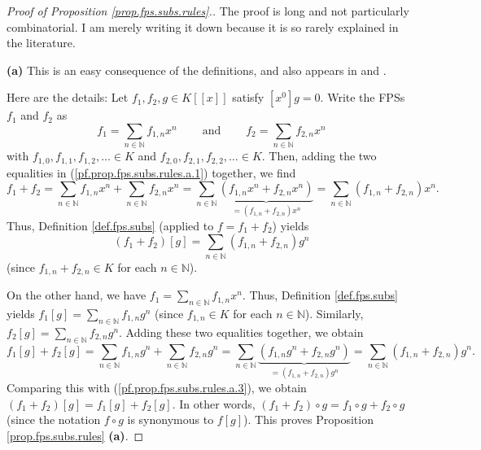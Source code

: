 \begin{proof}
[Proof of Proposition \ref{prop.fps.subs.rules}.]The proof is long and not
particularly combinatorial. I am merely writing it down because it is so
rarely explained in the literature. \medskip

\textbf{(a)} This is an easy consequence of the definitions, and also appears
in \cite[Theorem 7.62]{Loehr-BC} and \cite[Proposition 2.2.2]{Brewer14}.

Here are the details: Let $f_{1},f_{2},g\in K\left[  \left[  x\right]
\right]  $ satisfy $\left[  x^{0}\right]  g=0$. Write the FPSs $f_{1}$ and
$f_{2}$ as
\begin{equation}
f_{1}=\sum_{n\in\mathbb{N}}f_{1,n}x^{n}\ \ \ \ \ \ \ \ \ \ \text{and}%
\ \ \ \ \ \ \ \ \ \ f_{2}=\sum_{n\in\mathbb{N}}f_{2,n}x^{n}
\label{pf.prop.fps.subs.rules.a.1}%
\end{equation}
with $f_{1,0},f_{1,1},f_{1,2},\ldots\in K$ and $f_{2,0},f_{2,1},f_{2,2}%
,\ldots\in K$. Then, adding the two equalities in
(\ref{pf.prop.fps.subs.rules.a.1}) together, we find%
\[
f_{1}+f_{2}=\sum_{n\in\mathbb{N}}f_{1,n}x^{n}+\sum_{n\in\mathbb{N}}%
f_{2,n}x^{n}=\sum_{n\in\mathbb{N}}\underbrace{\left(  f_{1,n}x^{n}%
+f_{2,n}x^{n}\right)  }_{=\left(  f_{1,n}+f_{2,n}\right)  x^{n}}=\sum
_{n\in\mathbb{N}}\left(  f_{1,n}+f_{2,n}\right)  x^{n}.
\]
Thus, Definition \ref{def.fps.subs} (applied to $f=f_{1}+f_{2}$) yields%
\begin{equation}
\left(  f_{1}+f_{2}\right)  \left[  g\right]  =\sum_{n\in\mathbb{N}}\left(
f_{1,n}+f_{2,n}\right)  g^{n} \label{pf.prop.fps.subs.rules.a.3}%
\end{equation}
(since $f_{1,n}+f_{2,n}\in K$ for each $n\in\mathbb{N}$).

On the other hand, we have $f_{1}=\sum_{n\in\mathbb{N}}f_{1,n}x^{n}$. Thus,
Definition \ref{def.fps.subs} yields $f_{1}\left[  g\right]  =\sum
_{n\in\mathbb{N}}f_{1,n}g^{n}$ (since $f_{1,n}\in K$ for each $n\in\mathbb{N}%
$). Similarly, $f_{2}\left[  g\right]  =\sum_{n\in\mathbb{N}}f_{2,n}g^{n}$.
Adding these two equalities together, we obtain%
\[
f_{1}\left[  g\right]  +f_{2}\left[  g\right]  =\sum_{n\in\mathbb{N}}%
f_{1,n}g^{n}+\sum_{n\in\mathbb{N}}f_{2,n}g^{n}=\sum_{n\in\mathbb{N}%
}\underbrace{\left(  f_{1,n}g^{n}+f_{2,n}g^{n}\right)  }_{=\left(
f_{1,n}+f_{2,n}\right)  g^{n}}=\sum_{n\in\mathbb{N}}\left(  f_{1,n}%
+f_{2,n}\right)  g^{n}.
\]
Comparing this with (\ref{pf.prop.fps.subs.rules.a.3}), we obtain $\left(
f_{1}+f_{2}\right)  \left[  g\right]  =f_{1}\left[  g\right]  +f_{2}\left[
g\right]  $. In other words, $\left(  f_{1}+f_{2}\right)  \circ g=f_{1}\circ
g+f_{2}\circ g$ (since the notation $f\circ g$ is synonymous to $f\left[
g\right]  $). This proves Proposition \ref{prop.fps.subs.rules} \textbf{(a)}.


\end{proof}
